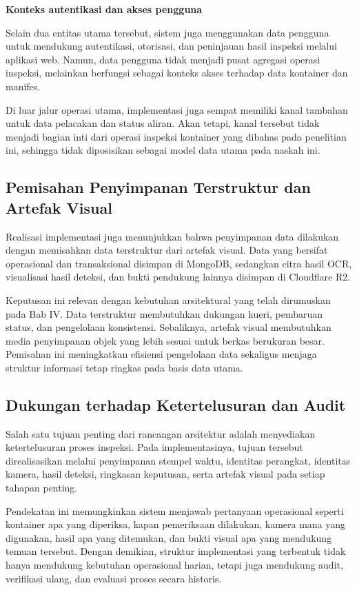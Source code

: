 \textbf{Konteks autentikasi dan akses pengguna}

Selain dua entitas utama tersebut, sistem juga menggunakan data pengguna untuk
mendukung autentikasi, otorisasi, dan peninjauan hasil inspeksi melalui aplikasi
web. Namun, data pengguna tidak menjadi pusat agregasi operasi inspeksi, melainkan
berfungsi sebagai konteks akses terhadap data kontainer dan manifes.

Di luar jalur operasi utama, implementasi juga sempat memiliki kanal tambahan
untuk data pelacakan dan status aliran. Akan tetapi, kanal tersebut tidak
menjadi bagian inti dari operasi inspeksi kontainer yang dibahas pada penelitian
ini, sehingga tidak diposisikan sebagai model data utama pada naskah ini.

\subsection{Pemisahan Penyimpanan Terstruktur dan Artefak Visual}
\label{subsec:pemisahan-penyimpanan}

Realisasi implementasi juga menunjukkan bahwa penyimpanan data dilakukan dengan
memisahkan data terstruktur dari artefak visual. Data yang bersifat operasional
dan transaksional disimpan di MongoDB, sedangkan citra hasil OCR, visualisasi
hasil deteksi, dan bukti pendukung lainnya disimpan di Cloudflare R2.

Keputusan ini relevan dengan kebutuhan arsitektural yang telah dirumuskan pada
Bab IV. Data terstruktur membutuhkan dukungan kueri, pembaruan status, dan
pengelolaan konsistensi. Sebaliknya, artefak visual membutuhkan media
penyimpanan objek yang lebih sesuai untuk berkas berukuran besar. Pemisahan ini
meningkatkan efisiensi pengelolaan data sekaligus menjaga struktur informasi
tetap ringkas pada basis data utama.

\subsection{Dukungan terhadap Ketertelusuran dan Audit}
\label{subsec:dukungan-ketertelusuran}

Salah satu tujuan penting dari rancangan arsitektur adalah menyediakan
ketertelusuran proses inspeksi. Pada implementasinya, tujuan tersebut
direalisasikan melalui penyimpanan stempel waktu, identitas perangkat,
identitas kamera, hasil deteksi, ringkasan keputusan, serta artefak visual pada
setiap tahapan penting.

Pendekatan ini memungkinkan sistem menjawab pertanyaan operasional seperti
kontainer apa yang diperiksa, kapan pemeriksaan dilakukan, kamera mana yang
digunakan, hasil apa yang ditemukan, dan bukti visual apa yang mendukung
temuan tersebut. Dengan demikian, struktur implementasi yang terbentuk tidak
hanya mendukung kebutuhan operasional harian, tetapi juga mendukung audit,
verifikasi ulang, dan evaluasi proses secara historis.

